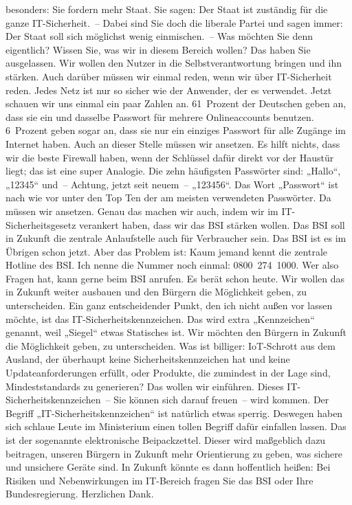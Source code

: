 \documentclass{article}
\begin{document}
besonders: Sie fordern mehr Staat. Sie sagen: Der Staat ist zuständig für die ganze IT-Sicherheit. – Dabei sind Sie doch die liberale Partei und sagen immer: Der Staat soll sich möglichst wenig einmischen. – Was möchten Sie denn eigentlich? Wissen Sie, was wir in diesem Bereich wollen? Das haben Sie ausgelassen. Wir wollen den Nutzer in die Selbstverantwortung bringen und ihn stärken. Auch darüber müssen wir einmal reden, wenn wir über IT-Sicherheit reden. Jedes Netz ist nur so sicher wie der Anwender, der es verwendet.  Jetzt schauen wir uns einmal ein paar Zahlen an. 61 Prozent der Deutschen geben an, dass sie ein und dasselbe Passwort für mehrere Onlineaccounts benutzen. 6 Prozent geben sogar an, dass sie nur ein einziges Passwort für alle Zugänge im Internet haben.  Auch an dieser Stelle müssen wir ansetzen. Es hilft nichts, dass wir die beste Firewall haben, wenn der Schlüssel dafür direkt vor der Haustür liegt; das ist eine super Analogie. Die zehn häufigsten Passwörter sind: „Hallo“, „12345“ und – Achtung, jetzt seit neuem – „123456“.  Das Wort „Passwort“ ist nach wie vor unter den Top Ten der am meisten verwendeten Passwörter. Da müssen wir ansetzen. Genau das machen wir auch, indem wir im IT-Sicherheitsgesetz verankert haben, dass wir das BSI stärken wollen.  Das BSI soll in Zukunft die zentrale Anlaufstelle auch für Verbraucher sein. Das BSI ist es im Übrigen schon jetzt. Aber das Problem ist: Kaum jemand kennt die zentrale Hotline des BSI. Ich nenne die Nummer noch einmal: 0800 274 1000. Wer also Fragen hat, kann gerne beim BSI anrufen. Es berät schon heute. Wir wollen das in Zukunft weiter ausbauen und den Bürgern die Möglichkeit geben, zu unterscheiden. Ein ganz entscheidender Punkt, den ich nicht außen vor lassen möchte, ist das IT-Sicherheitskennzeichen. Das wird extra „Kennzeichen“ genannt, weil „Siegel“ etwas Statisches ist. Wir möchten den Bürgern in Zukunft die Möglichkeit geben, zu unterscheiden. Was ist billiger: IoT-Schrott aus dem Ausland, der überhaupt keine Sicherheitskennzeichen hat und keine Updateanforderungen erfüllt, oder Produkte, die zumindest in der Lage sind, Mindeststandards zu generieren? Das wollen wir einführen. Dieses IT-Sicherheitskennzeichen – Sie können sich darauf freuen – wird kommen.  Der Begriff „IT-Sicherheitskennzeichen“ ist natürlich etwas sperrig. Deswegen haben sich schlaue Leute im Ministerium einen tollen Begriff dafür einfallen lassen. Das ist der sogenannte elektronische Beipackzettel. Dieser wird maßgeblich dazu beitragen, unseren Bürgern in Zukunft mehr Orientierung zu geben, was sichere und unsichere Geräte sind. In Zukunft könnte es dann hoffentlich heißen: Bei Risiken und Nebenwirkungen im IT-Bereich fragen Sie das BSI oder Ihre Bundesregierung.  Herzlichen Dank.  
\end{document}
